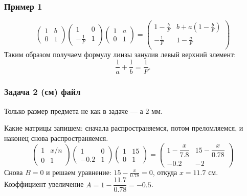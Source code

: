 \subsubsection*{Пример 1}
\begin{equation*}
	\begin{pmatrix}
			1 & b \\ 0 & 1
	\end{pmatrix}
	\begin{pmatrix}
			1 & 0 \\ -\frac{1}{F} & 1
	\end{pmatrix}
	\begin{pmatrix}
			1 & a \\ 0 & 1
	\end{pmatrix}
	= 
	\left(
\begin{array}{cc}
 1-\frac{b}{F} & b+a \left(1-\frac{b}{F}\right) \\
 -\frac{1}{F} & 1-\frac{a}{F} \\
\end{array}
\right)
\end{equation*}
Таким образом получаем формулу линзы занулив левый верхний элемент:
\begin{equation}
	\frac{1}{a} + \frac{1}{b} = \frac{1}{F}.
\end{equation}

\subsubsection*{Задача 2 (см) файл}
Только размер предмета не как в задаче --- а $2$ мм.

Какие матрицы запишем: сначала распространяемся, потом преломляемся, и наконец снова распространяемся.
\begin{equation*}
\begin{pmatrix}
		1 & x/n \\ 0 & 1
	\end{pmatrix}
\begin{pmatrix}
		1 & 0 \\ -0.2 & 1
	\end{pmatrix}
	\begin{pmatrix}
		1 & 15 \\ 0 & 1
	\end{pmatrix}
	=
	\begin{pmatrix}
		1- \dfrac{x}{7.8} & 15 - \dfrac{x}{0.78} \\ -0.2 & -2
	\end{pmatrix}
\end{equation*}
Снова $B = 0$ и решаем уравнение: $15 - \frac{x}{0.78} = 0$, откуда $x = 11.7$ см.
Коэффициент увеличение  $A = 1 - \dfrac{11.7}{0.78} = -0.5$.

